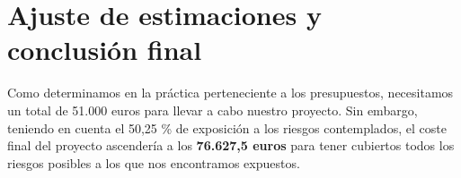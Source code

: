 \section{Ajuste de estimaciones y conclusión final}

Como determinamos en la práctica perteneciente a los presupuestos, necesitamos un total de 51.000 euros para llevar a cabo nuestro proyecto. Sin embargo, teniendo en cuenta el 50,25 \% de exposición a los riesgos contemplados, el coste final del proyecto ascendería a los \textbf{76.627,5 euros} para tener cubiertos todos los riesgos posibles a los que nos encontramos expuestos.





%
%

       
